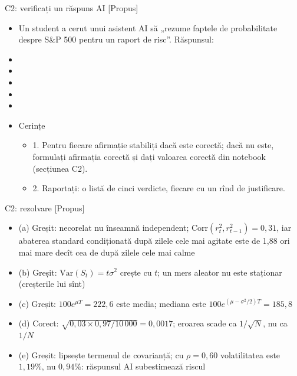 \begin{frame}{C2: verificați un răspuns AI [Propus]}
\itemsize{\scriptsize}
\begin{itemize}
    \item Un student a cerut unui asistent AI să „rezume faptele de probabilitate despre S\&P 500 pentru un raport de risc”. Răspunsul:
    \item {}
    \item {}
    \item {}
    \item {}
    \item {}
    \item Cerințe
    \begin{itemize}
        \item 1. Pentru fiecare afirmație stabiliți dacă este corectă; dacă nu este, formulați afirmația corectă și dați valoarea corectă din notebook (secțiunea C2).
        \item 2. Raportați: o listă de cinci verdicte, fiecare cu un rînd de justificare.
    \end{itemize}
\end{itemize}
\end{frame}

\ifsolutions
\begin{frame}{C2: rezolvare [Propus]}
\itemsize{\footnotesize}
\begin{itemize}
    \item (a) Greșit: necorelat nu înseamnă independent; $\text{Corr}(r_t^2, r_{t-1}^2) = 0{,}31$, iar abaterea standard condiționată după zilele cele mai agitate este de 1{,}88 ori mai mare decît cea de după zilele cele mai calme
    \item (b) Greșit: $\text{Var}(S_t) = t\sigma^2$ crește cu $t$; un mers aleator nu este staționar (creșterile lui sînt)
    \item (c) Greșit: $100e^{\mu T} = 222{,}6$ este media; mediana este $100e^{(\mu - \sigma^2/2)T} = 185{,}8$
    \item (d) Corect: $\sqrt{0{,}03 \times 0{,}97/10\,000} = 0{,}0017$; eroarea scade ca $1/\sqrt{N}$, nu ca $1/N$
    \item (e) Greșit: lipsește termenul de covarianță; cu $\rho = 0{,}60$ volatilitatea este $1{,}19\%$, nu $0{,}94\%$: răspunsul AI subestimează riscul
\end{itemize}
\end{frame}
\fi


